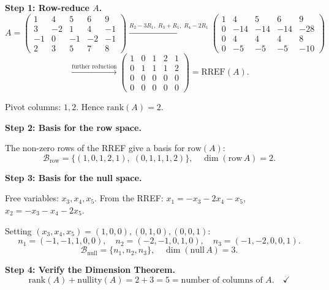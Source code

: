 \documentclass[12pt,a3paper]{article}
\begin{document}
\begin{tcolorbox}[enhanced,breakable,
  colback=cC!4,colframe=cC,boxrule=0.8pt,arc=5pt,
  title={\textbf{Answer --- Row Space, Null Space \& Dimension Theorem}},
  fonttitle=\bfseries\color{white},colbacktitle=cC]

\textbf{Step 1: Row-reduce $A$.}
\[
A = \begin{pmatrix}
 1 &  4 &  5 &  6 &  9 \\
 3 & -2 &  1 &  4 & -1 \\
-1 &  0 & -1 & -2 & -1 \\
 2 &  3 &  5 &  7 &  8
\end{pmatrix}
\xrightarrow{R_2-3R_1,\;R_3+R_1,\;R_4-2R_1}
\begin{pmatrix}
1 &  4 &  5 &  6 &  9 \\
0 & -14& -14& -14& -28\\
0 &  4 &  4 &  4 &  8 \\
0 & -5 & -5 & -5 & -10
\end{pmatrix}
\]
\[
\xrightarrow{\text{further reduction}}
\begin{pmatrix}
1 & 0 & 1 & 2 & 1 \\
0 & 1 & 1 & 1 & 2 \\
0 & 0 & 0 & 0 & 0 \\
0 & 0 & 0 & 0 & 0
\end{pmatrix} = \text{RREF}(A).
\]

Pivot columns: $1, 2$. Hence $\mathrm{rank}(A) = 2$.

\medskip
\textbf{Step 2: Basis for the row space.}

The non-zero rows of the RREF give a basis for $\mathrm{row}(A)$:
\[
\boxed{\mathcal{B}_{\text{row}} = \{(1,0,1,2,1),\;(0,1,1,1,2)\}}, \quad \dim(\mathrm{row}\,A) = 2.
\]

\medskip
\textbf{Step 3: Basis for the null space.}

Free variables: $x_3, x_4, x_5$. From the RREF:
$x_1 = -x_3 - 2x_4 - x_5$, $x_2 = -x_3 - x_4 - 2x_5$.

Setting $(x_3,x_4,x_5) = (1,0,0),(0,1,0),(0,0,1)$:
\[
n_1 = (-1,-1,1,0,0),\quad n_2 = (-2,-1,0,1,0),\quad n_3 = (-1,-2,0,0,1).
\]
\[
\boxed{\mathcal{B}_{\text{null}} = \{n_1, n_2, n_3\}}, \quad \dim(\mathrm{null}\,A) = 3.
\]

\medskip
\textbf{Step 4: Verify the Dimension Theorem.}
\[
\mathrm{rank}(A) + \mathrm{nullity}(A) = 2 + 3 = 5 = \text{number of columns of } A. \quad \checkmark
\]

\end{tcolorbox}
\end{document}
